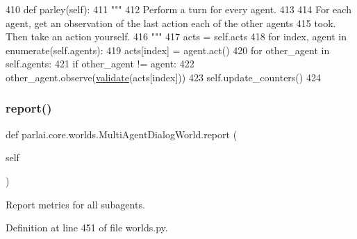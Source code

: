 \begin{DoxyCode}
410     \textcolor{keyword}{def }parley(self):
411         \textcolor{stringliteral}{"""}
412 \textcolor{stringliteral}{        Perform a turn for every agent.}
413 \textcolor{stringliteral}{}
414 \textcolor{stringliteral}{        For each agent, get an observation of the last action each of the other agents}
415 \textcolor{stringliteral}{        took. Then take an action yourself.}
416 \textcolor{stringliteral}{        """}
417         acts = self.acts
418         \textcolor{keywordflow}{for} index, agent \textcolor{keywordflow}{in} enumerate(self.agents):
419             acts[index] = agent.act()
420             \textcolor{keywordflow}{for} other\_agent \textcolor{keywordflow}{in} self.agents:
421                 \textcolor{keywordflow}{if} other\_agent != agent:
422                     other\_agent.observe(\hyperlink{namespaceparlai_1_1core_1_1worlds_afc3fad603b7bce41dbdc9cdc04a9c794}{validate}(acts[index]))
423         self.update\_counters()
424 
\end{DoxyCode}
\mbox{\label{classparlai_1_1core_1_1worlds_1_1MultiAgentDialogWorld_a686b237998ede0e9431dd58bca2b34c1}} 
\subsubsection{\texorpdfstring{report()}{report()}}
{\footnotesize\ttfamily def parlai.\+core.\+worlds.\+Multi\+Agent\+Dialog\+World.\+report (\begin{DoxyParamCaption}\item[{}]{self }\end{DoxyParamCaption})}

\begin{DoxyVerb}Report metrics for all subagents.
\end{DoxyVerb}
 

Definition at line 451 of file worlds.\+py.


